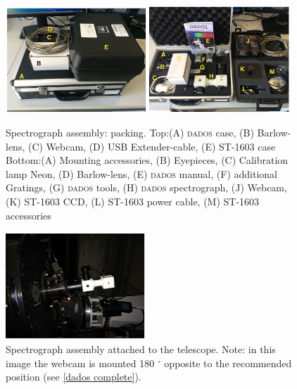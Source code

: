 \documentclass[a4paper, 11pt, fleqn]{memoir}
\begin{document}
\begin{figure}
    \centering
    \includegraphics[width=0.47\textwidth]{dados-packing}
    \includegraphics[width=0.47\textwidth]{dados-packing2}
    \caption{Spectrograph assembly: packing.
        \newline Top:\newline (A) \textsc{dados} case, (B) Barlow-lens, (C) Webcam, (D) USB Extender-cable, (E) ST-1603 case \newline Bottom:\newline (A) Mounting accessories, (B) Eyepieces, (C) Calibration lamp Neon, (D) Barlow-lens, \newline (E) \textsc{dados} manual, (F) additional Gratings, (G) \textsc{dados} tools, (H) \textsc{dados} spectrograph, \newline (J) Webcam, (K) ST-1603 CCD, (L) ST-1603 power cable, (M) ST-1603 accessories }
    \label{packing}
\end{figure}

\begin{figure}
    \centering
    \includegraphics[width=0.47\textwidth]{dados-telescope}
    \caption{Spectrograph assembly attached to the telescope.  \newline Note: in this image the webcam is mounted 180 $^\circ$ opposite to the recommended position (see \cref{dados complete}).}
    \label{dados telescope}
\end{figure}
\end{document}
